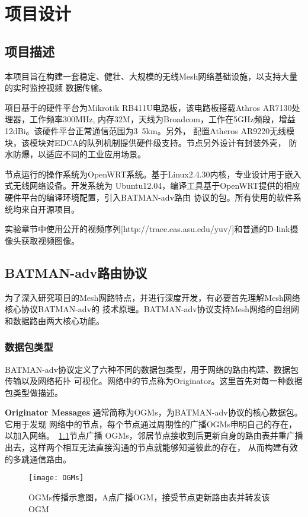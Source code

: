 \chapter{项目设计}
\label{cha:project_design}

\section{项目描述}
本项目旨在构建一套稳定、健壮、大规模的无线Mesh网络基础设施，以支持大量的实时监控视频
数据传输。

项目基于的硬件平台为Mikrotik RB411U电路板，该电路板搭载Athros AR7130处理器，工作频率300MHz,
内存32M，天线为Broadcom，工作在5GHz频段，增益12dBi。该硬件平台正常通信范围为3~5km。另外，
配置Atheros AR9220无线模块，该模块对EDCA的队列机制提供硬件级支持。节点另外设计有封装外壳，
防水防爆，以适应不同的工业应用场景。

节点运行的操作系统为OpenWRT系统。基于Linux2.4.30内核，专业设计用于嵌入式无线网络设备。开发系统为
Ubuntu12.04，编译工具基于OpenWRT提供的相应硬件平台的编译环境配置，引入BATMAN-adv路由
协议的包。所有使用的软件系统均来自开源项目。

实验章节中使用公开的视频序列[http://trace.eas.asu.edu/yuv/]和普通的D-link摄像头获取视频图像。

\section{BATMAN-adv路由协议}
为了深入研究项目的Mesh网路特点，并进行深度开发，有必要首先理解Mesh网络核心协议BATMAN-adv的
技术原理。BATMAN-adv协议支持Mesh网络的自组网和数据路由两大核心功能。

\subsection{数据包类型}
BATMAN-adv协议定义了六种不同的数据包类型，用于网络的路由构建、数据包传输以及网络拓扑
可视化。网络中的节点称为Originator。这里首先对每一种数据包类型做描述。

\textbf{Originator Messages} 通常简称为OGMs，为BATMAN-adv协议的核心数据包。它用于发现
网络中的节点，每个节点通过周期性的广播OGMs申明自己的存在，以加入网络。~\ref{fig:ogms}节点广播
OGMs，邻居节点接收到后更新自身的路由表并重广播出去，这样两个相互无法直接沟通的节点就能够知道彼此的存在，
从而构建有效的多跳通信路由。
\begin{figure}[H] %
  \centering
  \texttt{[image: OGMs]}
  \caption{OGMs传播示意图，A点广播OGM，接受节点更新路由表并转发该OGM}
  \label{fig:ogms}
\end{figure}

